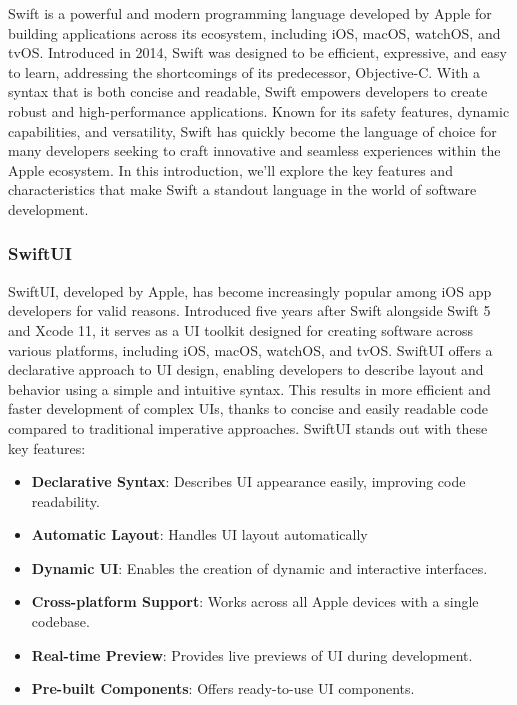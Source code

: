 Swift is a powerful and modern programming language developed by Apple for building applications across its ecosystem, including iOS, macOS, watchOS, and tvOS. Introduced in 2014, Swift was designed to be efficient, expressive, and easy to learn, addressing the shortcomings of its predecessor, Objective-C. With a syntax that is both concise and readable, Swift empowers developers to create robust and high-performance applications. Known for its safety features, dynamic capabilities, and versatility, Swift has quickly become the language of choice for many developers seeking to craft innovative and seamless experiences within the Apple ecosystem. In this introduction, we'll explore the key features and characteristics that make Swift a standout language in the world of software development.

\subsubsection{SwiftUI}

SwiftUI, developed by Apple, has become increasingly popular among iOS app developers for valid reasons. Introduced five years after Swift alongside Swift 5 and Xcode 11, it serves as a UI toolkit designed for creating software across various platforms, including iOS, macOS, watchOS, and tvOS. SwiftUI offers a declarative approach to UI design, enabling developers to describe layout and behavior using a simple and intuitive syntax. This results in more efficient and faster development of complex UIs, thanks to concise and easily readable code compared to traditional imperative approaches. SwiftUI stands out with these key features:

\begin{itemize}
    \item \textbf{Declarative Syntax}: Describes UI appearance easily, improving code readability.
    \item \textbf{Automatic Layout}: Handles UI layout automatically
    \item \textbf{Dynamic UI}: Enables the creation of dynamic and interactive interfaces.
    \item \textbf{Cross-platform Support}: Works across all Apple devices with a single codebase.
    \item \textbf{Real-time Preview}: Provides live previews of UI during development.
    \item \textbf{Pre-built Components}: Offers ready-to-use UI components.
\end{itemize}

